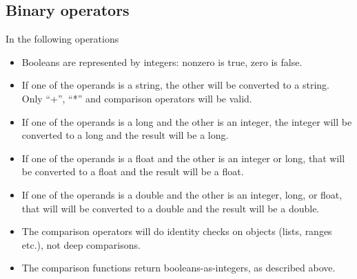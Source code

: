 \subsection{Binary operators}
In the following operations
\begin{itemize}
\item Booleans are represented by integers: nonzero is true, zero is false.
\item If one of the operands is a string, the other will be converted to a string. Only ``+'', ``*''  and comparison operators will be valid.
\item If one of the operands is a long and the other is an integer, the integer will be converted to a long and the result will be a long.
\item If one of the operands is a float and the other is an integer or long, that will be converted to a float and the result will be a float.
\item If one of the operands is a double and the other is an integer, long, or float, that will will be converted to a double and the result will be a double.
\item The comparison operators will do identity checks on objects (lists, ranges etc.), not deep comparisons.
\item The comparison functions return booleans-as-integers, as described above.
\end{itemize}
